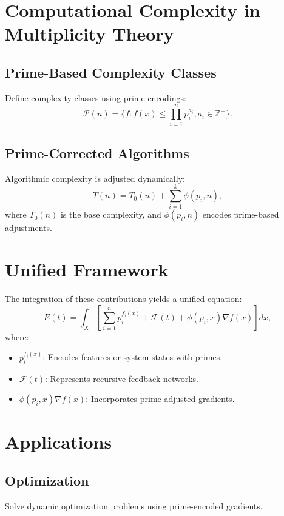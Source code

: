\documentclass{article}
\theoremstyle{plain}
\begin{document}
\section{Computational Complexity in Multiplicity Theory}

\subsection{Prime-Based Complexity Classes}
Define complexity classes using prime encodings:
\begin{equation}
    \mathcal{P}(n) = \{f : f(x) \leq \prod_{i=1}^n p_i^{a_i}, a_i \in \mathbb{Z}^+\}.
\end{equation}

\subsection{Prime-Corrected Algorithms}
Algorithmic complexity is adjusted dynamically:
\begin{equation}
    T(n) = T_0(n) + \sum_{i=1}^k \phi(p_i, n),
\end{equation}
where \(T_0(n)\) is the base complexity, and \(\phi(p_i, n)\) encodes prime-based adjustments.

\section{Unified Framework}

The integration of these contributions yields a unified equation:
\begin{equation}
    E(t) = \int_X \left[ \sum_{i=1}^n p_i^{f_i(x)} + \mathcal{F}(t) + \phi(p_i, x) \nabla f(x) \right] dx,
\end{equation}
where:
\begin{itemize}
    \item \(p_i^{f_i(x)}\): Encodes features or system states with primes.
    \item \(\mathcal{F}(t)\): Represents recursive feedback networks.
    \item \(\phi(p_i, x) \nabla f(x)\): Incorporates prime-adjusted gradients.
\end{itemize}

\section{Applications}

\subsection{Optimization}
Solve dynamic optimization problems using prime-encoded gradients.
\end{document}
